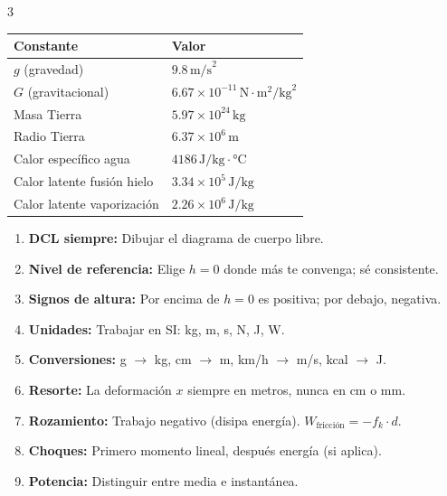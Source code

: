 \documentclass[10pt,landscape]{article}
\begin{document}
\begin{multicols}{3}
\begin{center}
\begin{tabular}{@{}ll@{}}
\toprule
\textbf{Constante} & \textbf{Valor} \\
\midrule
$g$ (gravedad) & $9.8\,\text{m/s}^2$ \\
$G$ (gravitacional) & $6.67 \times 10^{-11}\,\text{N}\cdot\text{m}^2/\text{kg}^2$ \\
Masa Tierra & $5.97 \times 10^{24}\,\text{kg}$ \\
Radio Tierra & $6.37 \times 10^6\,\text{m}$ \\
Calor espec\'{i}fico agua & $4186\,\text{J/kg}\cdot°\text{C}$ \\
Calor latente fusi\'{o}n hielo & $3.34 \times 10^5\,\text{J/kg}$ \\
Calor latente vaporizaci\'{o}n & $2.26 \times 10^6\,\text{J/kg}$ \\
\bottomrule
\end{tabular}
\end{center}

\vspace{4pt}

\begin{enumerate}[leftmargin=*,nosep,topsep=0pt]
  \item \textbf{DCL siempre:} Dibujar el diagrama de cuerpo libre.
  \item \textbf{Nivel de referencia:} Elige $h=0$ donde m\'{a}s te convenga; s\'{e} consistente.
  \item \textbf{Signos de altura:} Por encima de $h=0$ es positiva; por debajo, negativa.
  \item \textbf{Unidades:} Trabajar en SI: kg, m, s, N, J, W.
  \item \textbf{Conversiones:} g $\to$ kg, cm $\to$ m, km/h $\to$ m/s, kcal $\to$ J.
  \item \textbf{Resorte:} La deformaci\'{o}n $x$ siempre en metros, nunca en cm o mm.
  \item \textbf{Rozamiento:} Trabajo negativo (disipa energ\'{i}a). $W_{\text{fricci\'{o}n}} = -f_k \cdot d$.
  \item \textbf{Choques:} Primero momento lineal, despu\'{e}s energ\'{i}a (si aplica).
  \item \textbf{Potencia:} Distinguir entre media e instant\'{a}nea.
\end{enumerate}

\end{multicols}
\end{document}
